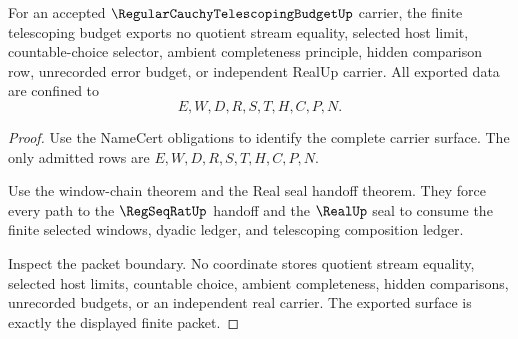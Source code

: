 \begin{theorem}
\label{thm:regular-cauchy-telescoping-budget-nonescape}
For an accepted $\RegularCauchyTelescopingBudgetUp$ carrier, the finite telescoping budget exports no quotient stream equality, selected host limit, countable-choice selector, ambient completeness principle, hidden comparison row, unrecorded error budget, or independent RealUp carrier. All exported data are confined to
$$
E,W,D,R,S,T,H,C,P,N.
$$
\end{theorem}
\begin{proof}
Use the NameCert obligations to identify the complete carrier surface. The only admitted rows are $E,W,D,R,S,T,H,C,P,N$.

Use the window-chain theorem and the Real seal handoff theorem. They force every path to the $\RegSeqRatUp$ handoff and the $\RealUp$ seal to consume the finite selected windows, dyadic ledger, and telescoping composition ledger.

Inspect the packet boundary. No coordinate stores quotient stream equality, selected host limits, countable choice, ambient completeness, hidden comparisons, unrecorded budgets, or an independent real carrier. The exported surface is exactly the displayed finite packet.
\end{proof}

